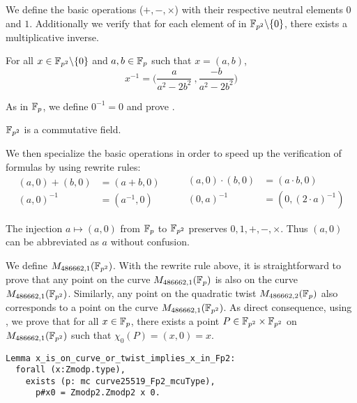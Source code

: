 We define the basic operations ($+, -, \times$) with their respective neutral
elements $0$ and $1$. Additionally we verify that for each element of in
$\mathbb{F}_{p^2}\backslash\{0\}$, there exists a multiplicative inverse.
\begin{lemma}
  \label{lemma:Zmodp2_inv}
  For all $x \in \mathbb{F}_{p^2}\backslash\{0\}$ and $a,b \in \mathbb{F}_{p}$ such that $x = (a,b)$,
  $$x^{-1} = \Big(\frac{a}{a^2-2b^2}\ , \frac{-b}{a^2-2b^2}\Big)$$
\end{lemma}
As in $\mathbb{F}_{p}$, we define $0^{-1} = 0$ and prove .
\begin{lemma}
  \label{lemma:Zmodp2_field}
  $\mathbb{F}_{p^2}$ is a commutative field.
\end{lemma}

We then specialize the basic operations in order to speed up the verification
of formulas by using rewrite rules:
\begin{equation*}
  \begin{split}
    (a,0) + (b,0) &= (a+b, 0)\\
    (a, 0)^{-1} &= (a^{-1}, 0)
  \end{split}
  \qquad
  \begin{split}
    (a,0) \cdot   (b,0) &= (a \cdot b, 0)\\
    (0,a)^{-1} &= (0,(2\cdot a)^{-1})
  \end{split}
\end{equation*}

The injection $a \mapsto (a,0)$ from $\mathbb{F}_{p}$ to $\mathbb{F}_{p^2}$ preserves
$0, 1, +, -, \times$. Thus $(a,0)$ can be abbreviated as $a$ without confusion.

We define $M_{486662,1}(\mathbb{F}_{p^2})$. With the rewrite rule above, it is straightforward
to prove that any point on the curve $M_{486662,1}(\mathbb{F}_{p})$ is also on the curve
$M_{486662,1}(\mathbb{F}_{p^2})$. Similarly, any point on the quadratic twist
$M_{486662,2}(\mathbb{F}_{p})$ also corresponds to a point on the curve $M_{486662,1}(\mathbb{F}_{p^2})$.
As direct consequence, using , we prove that for all
$x \in \mathbb{F}_{p}$, there exists a point $P \in \mathbb{F}_{p^2}\times\mathbb{F}_{p^2}$ on
$M_{486662,1}(\mathbb{F}_{p^2})$ such that $\chi_0(P) = (x,0) = x$.

\begin{lstlisting}[language=Coq,belowskip=-0.25 \baselineskip]
Lemma x_is_on_curve_or_twist_implies_x_in_Fp2:
  forall (x:Zmodp.type),
    exists (p: mc curve25519_Fp2_mcuType),
      p#x0 = Zmodp2.Zmodp2 x 0.
\end{lstlisting}

